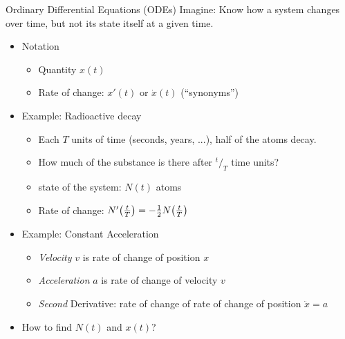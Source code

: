 
\begin{frame}{Ordinary Differential Equations (ODEs)}
%
Imagine: Know how a system changes over time, but not its state itself at a given time.
\begin{itemize}
\item Notation
	\begin{itemize}
	\item Quantity $x(t)$
	\item Rate of change: $x'(t)$ or $\dot{x}(t)$ (\enquote{synonyms})
	\end{itemize}
\item Example: Radioactive decay
	\begin{itemize}
	\item Each $T$ units of time (seconds, years, ...), half of the atoms decay.
	\item[\Thus] How much of the substance is there after ${}^{t}/_T$ time units?
	\item state of the system: $N(t)$ atoms
	\item Rate of change: $N'\qty(\frac{t}{T}) = -\frac{1}{2} N\qty(\frac{t}{T})$
	\end{itemize}
\item Example: Constant Acceleration
	\begin{itemize}
	\item \emph{Velocity} $v$ is rate of change of position $x$
	\item \emph{Acceleration} $a$ is rate of change of velocity $v$
	\item \emph{Second} Derivative: rate of change of rate of change of position $\ddot{x} = a$
	\end{itemize}
\item[\Thus] How to find $N(t)$ and $x(t)$?
\end{itemize}
%
\end{frame}


